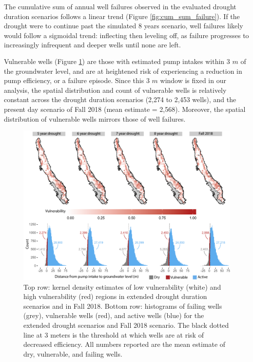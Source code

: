 The cumulative sum of annual well failures observed in the evaluated drought duration scenarios follows a linear trend (Figure \ref{fig:cum_sum_failure}). If the drought were to continue past the simulated 8 years scenario, well failures likely would follow a sigmoidal trend: inflecting then leveling off, as failure progresses to increasingly infrequent and deeper wells until none are left.  

Vulnerable wells (Figure \ref{fig:vi}) are those with estimated pump intakes within 3 $m$ of the groundwater level, and are at heightened risk of experiencing a reduction in pump efficiency, or a failure episode. Since this 3 $m$ window is fixed in our analysis, the spatial distribution and count of vulnerable wells is relatively constant across the drought duration scenarios (2,274 to 2,453 wells), and the present day scenario of Fall 2018 (mean estimate = 2,568). Moreover, the spatial distribution of vulnerable wells mirrors those of well failures.

\begin{figure}
	\includegraphics[width=17.8 cm]{ch2_figs/fig_vi.pdf}
	\caption{Top row: kernel density estimates of low vulnerability (white) and high vulnerability (red) regions in extended drought duration scenarios and in Fall 2018. Bottom row: histograms of failing wells (grey), vulnerable wells (red), and active wells (blue) for the extended drought scenarios and Fall 2018 scenario. The black dotted line at 3 meters is the threshold at which wells are at risk of decreased efficiency. All numbers reported are the mean estimate of dry, vulnerable, and failing wells.}
	\label{fig:vi}
\end{figure}



